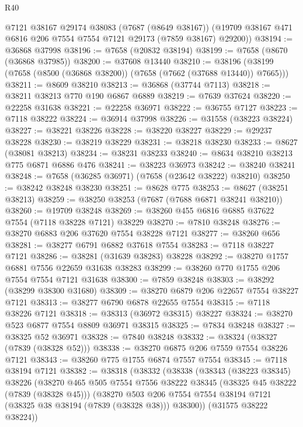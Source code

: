 \begin{lexlean}{R40}
\begin{coremodule}
      @7121
      @38167
      @29174
      @38083
      (@7687 (@8649 @38167))
      (@19709 @38167 @471 @6816 @206 @7554 @7554 @7121 @29173 (@7859 @38167) @29200))
@38194 := @36868 @37998
@38196 := @7658 (@20832 @38194)
@38199 := @7658 (@8670 (@36868 @37985))
@38200 := @37608 @13440
@38210 := @38196 (@38199 (@7658 (@8500 (@36868 @38200)) (@7658 (@7662 (@37688 @13440)) @7665)))
@38211 := @8609 @38210
@38213 := @36868 (@37744 @7113)
@38218 := @38211 @38213 @770 @190 @6867 @6889
@38219 := @7639 @37624
@38220 := @22258 @31638
@38221 := @22258 @36971
@38222 := @36755 @7127
@38223 := @7118 @38222
@38224 := @36914 @37998
@38226 := @31558 (@38223 @38224)
@38227 := @38221 @38226
@38228 := @38220 @38227
@38229 := @29237 @38228
@38230 := @38219 @38229
@38231 := @38218 @38230
@38233 := @8627 (@38081 @38213)
@38234 := @38231 @38233
@38240 := @8634 @38210 @38213 @775 @6871 @6886 @476
@38241 := @38223 @36973
@38242 := @38240 @38241
@38248 := @7658 (@36285 @36971) (@7658 (@23642 @38222) @38210)
@38250 := @38242 @38248 @38230
@38251 := @8628 @775
@38253 := @8627 (@38251 @38213)
@38259 := @38250 @38253 (@7687 (@7688 @6871 @38241 @38210))
@38260 := @19709 @38248
@38269 := @38260 @455 @6816 @6885 @37622 @7554 (@7118 @38228 @7121) @38229
@38270 := @7810 @38248
@38276 := @38270 @6883 @206 @37620 @7554 @38228 @7121
@38277 := @38260 @656
@38281 := @38277 @6791 @6882 @37618 @7554
@38283 := @7118 @38227 @7121
@38286 := @38281 (@31639 @38283) @38228
@38292 := @38270 @1757 @6881 @7556 @22659 @31638 @38283
@38299 := @38260 @770 @1755 @206 @7554 @7554 @7121 @31638
@38300 := @7859 @38248
@38303 := @38292 (@38299 @38300 @31680)
@38309 := @38270 @6879 @206 @22657 @7554 @38227 @7121
@38313 := @38277 @6790 @6878 @22655 @7554
@38315 := @7118 @38226 @7121
@38318 := @38313 (@36972 @38315) @38227
@38324 := @38270 @523 @6877 @7554 @8809 @36971 @38315
@38325 := @7834 @38248
@38327 := @38325 @52 @36971
@38328 := @7840 @38248
@38332 := @38324 (@38327 (@7839 (@38328 @52)))
@38338 := @38270 @6875 @206 @7559 @7554 @38226 @7121
@38343 := @38260 @775 @1755 @6874 @7557 @7554
@38345 := @7118 @38194 @7121
@38382 := @38318
    (@38332
      (@38338
        (@38343
          (@38223 @38345)
          @38226
          (@38270
            @465
            @505
            @7554
            @7556
            @38222
            @38345
            (@38325 @45 @38222 (@7839 (@38328 @45)))
            (@38270
              @503
              @206
              @7554
              @7554
              @38194
              @7121
              (@38325 @38 @38194 (@7839 (@38328 @38)))
              @38300))
          (@31575 @38222 @38224))

\end{coremodule}
\end{lexlean}
